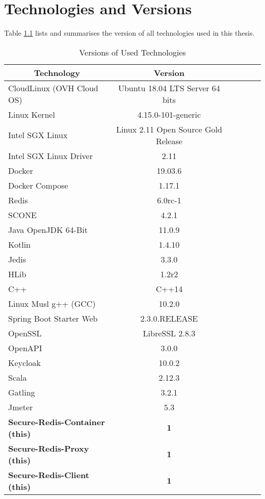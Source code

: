 \chapter{Technologies and Versions}
\label{ann:technologies_and_versions}

Table \ref{tab:versions_of_used_technologies} lists and summarises the version of all technologies used in this thesis.

\begin{table}[ht]
	\caption{Versions of Used Technologies}
	\label{tab:versions_of_used_technologies}
\centering
\begin{tabular}{lccccc}
	\toprule
	\multicolumn{1}{c}{\textbf{Technology}} 	& \multicolumn{1}{c}{\textbf{Version}} \\
	\midrule
		CloudLinux (OVH Cloud OS) 			& 		Ubuntu 18.04 LTS Server 64 bits 	\\
		Linux Kernel						&		4.15.0-101-generic					\\
		Intel SGX Linux						&		Linux 2.11 Open Source Gold Release \\
		Intel SGX Linux	Driver				&		2.11 								\\
		Docker								& 		19.03.6 								\\
		Docker Compose						& 		1.17.1 								\\
		Redis								& 		6.0rc-1 								\\
		SCONE 								& 		4.2.1 								\\
		Java OpenJDK 64-Bit 					& 		11.0.9								\\
		Kotlin 								& 		1.4.10								\\
		Jedis								&		3.3.0								\\
		HLib								&		1.2r2								\\
		C++									& 		C++14								\\
		Linux Musl g++ (GCC)					& 		10.2.0								\\
		Spring Boot Starter	Web				& 		2.3.0.RELEASE						\\
		OpenSSL								&		LibreSSL 2.8.3						\\
		OpenAPI								&		3.0.0								\\
		Keycloak							& 		10.0.2								\\
		Scala								& 		2.12.3								\\
		Gatling								& 		3.2.1								\\
		Jmeter								&		5.3									\\
	\midrule
	\textbf{Secure-Redis-Container (this)}	&		\textbf{1}							\\
	\textbf{Secure-Redis-Proxy (this)}		&		\textbf{1}							\\
	\textbf{Secure-Redis-Client	(this)}		&		\textbf{1}							\\
	\bottomrule
\end{tabular}
\end{table}
